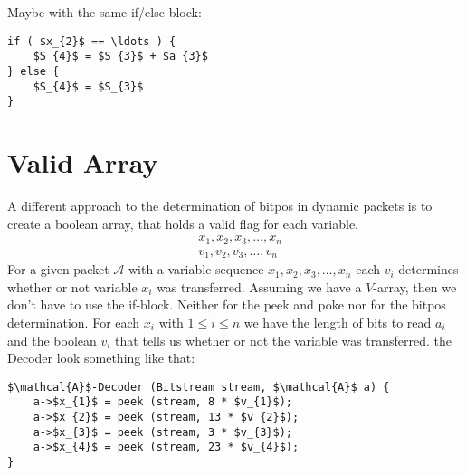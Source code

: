 \documentclass[paper=a4,DIV=12]{scrartcl}
\begin{document}
Maybe with the same if/else block:

\begin{lstlisting}[mathescape]
if ( $x_{2}$ == \ldots ) {
	$S_{4}$ = $S_{3}$ + $a_{3}$
} else {
	$S_{4}$ = $S_{3}$
}
\end{lstlisting}

\section{Valid Array}

A different approach to the determination of bitpos in dynamic packets is to create a boolean array, that holds a valid flag for each variable.
\begin{align*}
	&x_{1}, x_{2}, x_{3}, \ldots , x_{n}\\
	&v_{1}, v_{2}, v_{3}, \ldots , v_{n}	
\end{align*}
For a given packet $\mathcal{A}$ with a variable sequence $x_{1}, x_{2}, x_{3}, \ldots , x_{n}$ each $v_{i}$ determines whether or not variable $x_{i}$ was transferred.
Assuming we have a $V$-array, then we don't have to use the if-block.
Neither for the peek and poke nor for the bitpos determination.
For each $x_{i}$ with $1\leq i\leq n$ we have the length of bits to read $a_{i}$ and the boolean $v_{i}$ that tells us whether or not the variable was transferred.
the Decoder look something like that:
\begin{lstlisting}[mathescape]
$\mathcal{A}$-Decoder (Bitstream stream, $\mathcal{A}$ a) {
	a->$x_{1}$ = peek (stream, 8 * $v_{1}$);
	a->$x_{2}$ = peek (stream, 13 * $v_{2}$);
	a->$x_{3}$ = peek (stream, 3 * $v_{3}$);
	a->$x_{4}$ = peek (stream, 23 * $v_{4}$);
}
\end{lstlisting}
\end{document}

